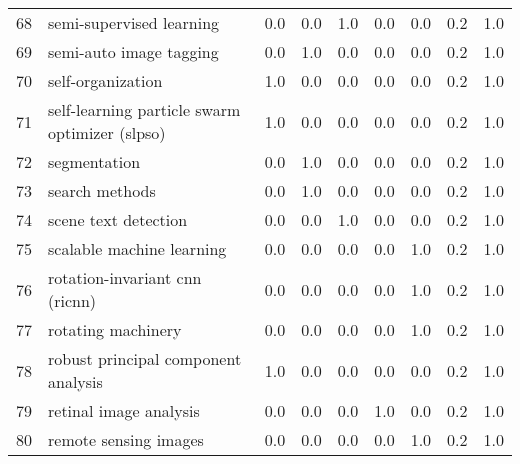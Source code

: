 \begin{tabular}{llrrrrrrr}
68 &                        semi-supervised learning &   0.0 &   0.0 &   1.0 &   0.0 &   0.0 &   0.2 &    1.0 \\
69 &                         semi-auto image tagging &   0.0 &   1.0 &   0.0 &   0.0 &   0.0 &   0.2 &    1.0 \\
70 &                               self-organization &   1.0 &   0.0 &   0.0 &   0.0 &   0.0 &   0.2 &    1.0 \\
71 &  self-learning particle swarm optimizer (slpso) &   1.0 &   0.0 &   0.0 &   0.0 &   0.0 &   0.2 &    1.0 \\
72 &                                    segmentation &   0.0 &   1.0 &   0.0 &   0.0 &   0.0 &   0.2 &    1.0 \\
73 &                                  search methods &   0.0 &   1.0 &   0.0 &   0.0 &   0.0 &   0.2 &    1.0 \\
74 &                            scene text detection &   0.0 &   0.0 &   1.0 &   0.0 &   0.0 &   0.2 &    1.0 \\
75 &                       scalable machine learning &   0.0 &   0.0 &   0.0 &   0.0 &   1.0 &   0.2 &    1.0 \\
76 &                  rotation-invariant cnn (ricnn) &   0.0 &   0.0 &   0.0 &   0.0 &   1.0 &   0.2 &    1.0 \\
77 &                              rotating machinery &   0.0 &   0.0 &   0.0 &   0.0 &   1.0 &   0.2 &    1.0 \\
78 &             robust principal component analysis &   1.0 &   0.0 &   0.0 &   0.0 &   0.0 &   0.2 &    1.0 \\
79 &                          retinal image analysis &   0.0 &   0.0 &   0.0 &   1.0 &   0.0 &   0.2 &    1.0 \\
80 &                           remote sensing images &   0.0 &   0.0 &   0.0 &   0.0 &   1.0 &   0.2 &    1.0 \\
\bottomrule
\end{tabular}

